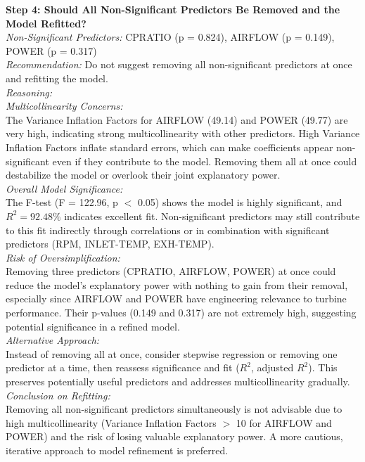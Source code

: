 \documentclass{article}
\begin{document}
\textbf{Step 4: Should All Non-Significant Predictors Be Removed and the Model Refitted?} \\
\textit{Non-Significant Predictors:} CPRATIO (p = 0.824), AIRFLOW (p = 0.149), POWER (p = 0.317) \\
\textit{Recommendation:} Do not suggest removing all non-significant predictors at once and refitting the model. \\
\textit{Reasoning:} \\
\textit{Multicollinearity Concerns:} \\
The Variance Inflation Factors for AIRFLOW (49.14) and POWER (49.77) are very high, indicating strong multicollinearity with other predictors. High Variance Inflation Factors inflate standard errors, which can make coefficients appear non-significant even if they contribute to the model. Removing them all at once could destabilize the model or overlook their joint explanatory power. \\
\textit{Overall Model Significance:} \\
The F-test (F = 122.96, p $<$ 0.05) shows the model is highly significant, and \( R^2 = 92.48\% \) indicates excellent fit. Non-significant predictors may still contribute to this fit indirectly through correlations or in combination with significant predictors (RPM, INLET-TEMP, EXH-TEMP). \\
\textit{Risk of Oversimplification:} \\
Removing three predictors (CPRATIO, AIRFLOW, POWER) at once could reduce the model’s explanatory power with nothing to gain from their removal, especially since AIRFLOW and POWER have engineering relevance to turbine performance. Their p-values (0.149 and 0.317) are not extremely high, suggesting potential significance in a refined model. \\
\textit{Alternative Approach:} \\
Instead of removing all at once, consider stepwise regression or removing one predictor at a time, then reassess significance and fit (\( R^2 \), adjusted \( R^2 \)). This preserves potentially useful predictors and addresses multicollinearity gradually. \\
\textit{Conclusion on Refitting:} \\
Removing all non-significant predictors simultaneously is not advisable due to high multicollinearity (Variance Inflation Factors $>$ 10 for AIRFLOW and POWER) and the risk of losing valuable explanatory power. A more cautious, iterative approach to model refinement is preferred.
\newpage
\end{document}
